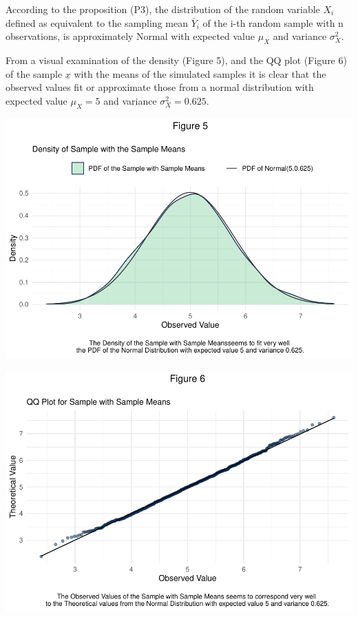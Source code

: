 \documentclass[
]{article}
\begin{document}
       According to the proposition (P3), the distribution of the random
       variable \(X_i\) defined as equivalent to the sampling mean
       \(\bar{Y}_i\) of the i-th random sample with n observations, is
       approximately Normal with expected value \(\mu_X\) and variance
       \(\sigma_X^2\).

       From a visual examination of the density (Figure 5), and the QQ
       plot (Figure 6) of the sample \(\underline{x}\) with the means of
       the simulated samples it is clear that the observed values fit or
       approximate those from a normal distribution with expected value
       \(\mu_X = 5\) and variance \(\sigma_X^2 = 0.625\).

       \includegraphics{CLT_files/figure-latex/unnamed-chunk-13-1.pdf}

       \includegraphics{CLT_files/figure-latex/unnamed-chunk-14-1.pdf}
\end{document}
